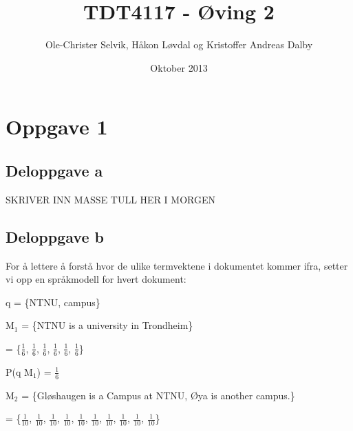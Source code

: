 \documentclass[]{article}
\begin{document}
\title{TDT4117 - Øving 2}
\author{Ole-Christer Selvik, Håkon Løvdal og Kristoffer Andreas Dalby}
\date{Oktober 2013}
\maketitle

\pagebreak

\section*{Oppgave 1}
\subsection*{Deloppgave a}

SKRIVER INN MASSE TULL HER I MORGEN

\subsection*{Deloppgave b}

For å lettere å forstå hvor de ulike termvektene i dokumentet kommer ifra, setter vi opp en språkmodell for hvert dokument:

\vspace{2mm}

q = \{NTNU, campus\}

\vspace{2mm}

M$_{1}$ = \{NTNU is a university in Trondheim\}

\vspace{2mm}

\hspace{3.2ex} = \{$\frac{1}{6}$, $\frac{1}{6}$, $\frac{1}{6}$, $\frac{1}{6}$, $\frac{1}{6}$, $\frac{1}{6}$\}

\vspace{2mm}

P(q \textbar M$_{1}$) = $\frac{1}{6}$

\vspace{5mm}

M$_{2}$ = \{Gløshaugen is a Campus at NTNU, Øya is another campus.\}\footnotemark[1]

\vspace{2mm}

\hspace{3.2ex} = \{$\frac{1}{10}$, $\frac{1}{10}$, $\frac{1}{10}$, $\frac{1}{10}$, $\frac{1}{10}$, $\frac{1}{10}$, $\frac{1}{10}$, $\frac{1}{10}$, $\frac{1}{10}$, $\frac{1}{10}$\}
\end{document}
